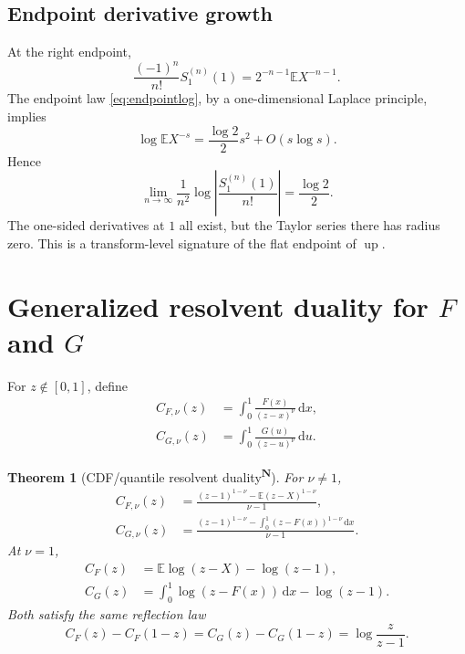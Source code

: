 \documentclass[11pt,oneside]{article}
\newtheorem{theorem}{Theorem}[section]
\theoremstyle{definition}
\theoremstyle{remark}
\newcommand{\F}{F}
\newcommand{\G}{G}
\newcommand{\Up}{\operatorname{up}}
\newcommand{\E}{\mathbb E}
\newcommand{\dd}{\,\mathrm d}
\newcommand{\tagnew}{\textsuperscript{\textcolor{oliveink}{\bfseries N}}}
\begin{document}
\subsection{Endpoint derivative growth}

At the right endpoint,
\begin{equation}\label{eq:Sendpointderiv}
 \frac{(-1)^n}{n!}S_1^{(n)}(1)
 =2^{-n-1}\E X^{-n-1}.
\end{equation}
The endpoint law \eqref{eq:endpointlog}, by a one-dimensional Laplace principle,
implies
\begin{equation}\label{eq:negmomentgrowth}
 \log\E X^{-s}=\frac{\log2}{2}s^2+O(s\log s).
\end{equation}
Hence
\begin{equation}\label{eq:Sdergrowth}
 \boxed{
 \lim_{n\to\infty}\frac1{n^2}
 \log\left|\frac{S_1^{(n)}(1)}{n!}\right|
 =\frac{\log2}{2}.}
\end{equation}
The one-sided derivatives at \(1\) all exist, but the Taylor series there has
radius zero.  This is a transform-level signature of the flat endpoint of
\(\Up\).

\section{Generalized resolvent duality for \(\F\) and \(\G\)}

For \(z\notin[0,1]\), define
\begin{align}
 C_{F,\nu}(z)&=\int_0^1\frac{\F(x)}{(z-x)^\nu}\dd x,\label{eq:CFnu}\\
 C_{G,\nu}(z)&=\int_0^1\frac{\G(u)}{(z-u)^\nu}\dd u.\label{eq:CGnu}
\end{align}

\begin{theorem}[CDF/quantile resolvent duality\tagnew]\label{thm:resdual}
For \(\nu\ne1\),
\begin{align}
 C_{F,\nu}(z)
 &=\frac{(z-1)^{1-\nu}-\E(z-X)^{1-\nu}}{\nu-1},\label{eq:CFdual}\\
 C_{G,\nu}(z)
 &=\frac{(z-1)^{1-\nu}
 -\displaystyle\int_0^1(z-\F(x))^{1-\nu}\dd x}{\nu-1}.
 \label{eq:CGdual}
\end{align}
At \(\nu=1\),
\begin{align}
 C_F(z)&=\E\log(z-X)-\log(z-1),\label{eq:CFlog}\\
 C_G(z)&=\int_0^1\log(z-\F(x))\dd x-\log(z-1).
 \label{eq:CGlog}
\end{align}
Both satisfy the same reflection law
\begin{equation}\label{eq:Creflection}
 C_F(z)-C_F(1-z)=C_G(z)-C_G(1-z)
 =\log\frac z{z-1}.
\end{equation}
\end{theorem}
\end{document}
